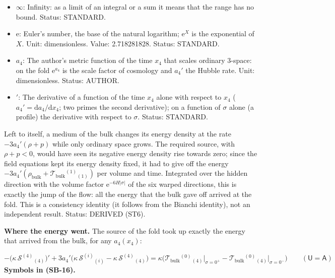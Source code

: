 \documentclass[
  10pt,
]{article}
\begin{document}
\begin{itemize}
  \(\mathrm{d}\sigma = \lvert\cot z\rvert\,\mathrm{d}x_0\),
  \(\sigma = \mathrm{sgn}(\pi/2 - z)\ln(\sin z)/(6H)\) on one period
  \(0 < z < \pi\); \(\sigma = 0\) is the fold \(z = \pi/2\),
  \(\sigma \to \mp\infty\) the tips \(z \to 0, \pi\); one period of
  \(x_0\) is the whole line \(-\infty < \sigma < \infty\). Unit: length.
  Status: DERIVED.
\item
  \(\infty\): Infinity: as a limit of an integral or a sum it means that
  the range has no bound. Status: STANDARD.
\item
  \(\mathrm{e}\): Euler's number, the base of the natural logarithm;
  \(\mathrm{e}^{X}\) is the exponential of \(X\). Unit: dimensionless.
  Value: 2.718281828. Status: STANDARD.
\item
  \(a_4\): The author's metric function of the time \(x_4\) that scales
  ordinary 3-space: on the fold \(\mathrm{e}^{a_4}\) is the scale factor
  of cosmology and \(a_4'\) the Hubble rate. Unit: dimensionless.
  Status: AUTHOR.
\item
  \({}'\): The derivative of a function of the time \(x_4\) alone with
  respect to \(x_4\) (\(a_4' = \mathrm{d}a_4/\mathrm{d}x_4\); two primes
  the second derivative); on a function of \(\sigma\) alone (a profile)
  the derivative with respect to \(\sigma\). Status: STANDARD.
\end{itemize}

Left to itself, a medium of the bulk changes its energy density at the
rate \(-3a_4'(\rho + p)\) while only ordinary space grows. The required
source, with \(\rho + p < 0\), would have seen its negative energy
density rise towards zero; since the field equations kept its energy
density fixed, it had to give off the energy
\(-3a_4'(\rho_{\mathrm{bulk}} + \mathcal{T}_{\mathrm{bulk}}{}^{(1)}{}_{(1)})\)
per volume and time. Integrated over the hidden direction with the
volume factor \(\mathrm{e}^{-6H\lvert\sigma\rvert}\) of the six warped
directions, this is exactly the jump of the flow: all the energy that
the bulk gave off arrived at the fold. This is a consistency identity
(it follows from the Bianchi identity), not an independent result.
Status: DERIVED (ST6).

\textbf{Where the energy went.} The source of the fold took up exactly
the energy that arrived from the bulk, for any \(a_4(x_4)\):

\[
-\big(\kappa\,\mathcal{S}^{(4)}{}_{(4)}\big)' + 3a_4'\big(\kappa\,\mathcal{S}^{(i)}{}_{(i)} - \kappa\,\mathcal{S}^{(4)}{}_{(4)}\big)
 = \kappa\Big(\mathcal{T}_{\mathrm{bulk}}{}^{(0)}{}_{(4)}\big\vert_{\sigma=0^+} - \mathcal{T}_{\mathrm{bulk}}{}^{(0)}{}_{(4)}\big\vert_{\sigma=0^-}\Big)
 \qquad (\mathsf{U} = \mathsf{A}) \tag{SB-16}
\] \textbf{Symbols in (SB-16).}
\end{document}
